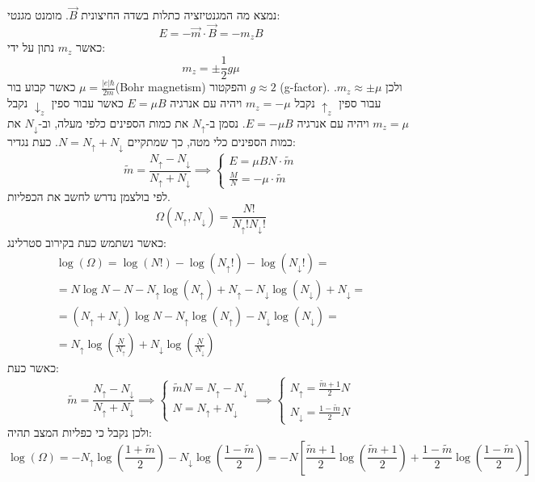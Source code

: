 \documentclass{tstextbook}
\begin{document}
\begin{example}
נמצא מה המגנטיזציה כתלות בשדה החיצונית \(\vec{B}\). מומנט מגנטי:
$$E=-\vec{m}\cdot \vec{B} = -m_{z}{B}$$
כאשר \(m_{z}\) נתון על ידי:
$$m_{z}= \pm \frac{1}{2}g \mu$$
כאשר קבוע בור \(\mu= \frac{|e|\hbar}{2m}\)(Bohr magnetism) והפקטור \(g\approx 2\) (g-factor). ולכן \(m_{z}\approx \pm \mu\).
עבור ספין \(\uparrow_{z}\) נקבל \(m_{z}=-\mu\) ויהיה עם אנרגיה \(E=\mu B\) כאשר עבור ספין \(\downarrow_{z}\) נקבל \(m_{z}=\mu\) ויהיה עם אנרגיה \(E=-\mu B\).
נסמן ב-\(N_{\uparrow}\) את כמות הספינים כלפי מעלה, וב-\(N_{\downarrow}\) את כמות הספינים כלי מטה, כך שמתקיים \(N=N_{\uparrow}+N_{\downarrow}\). כעת נגדיר:
$$\tilde{m}=\frac{N_{\uparrow }-N_{\downarrow }}{N_{\uparrow }+N_{\downarrow }}\implies \begin{cases}E=\mu B N \cdot \tilde{m} \\\frac{M}{N}=-\mu \cdot \tilde{m}
\end{cases}$$
לפי בולצמן נדרש לחשב את הכפליות.
$$\Omega\left( N_{\uparrow },N_{\downarrow } \right)=\frac{N!}{N_{\uparrow }!N_{\downarrow }!}$$
כאשר נשתמש כעת בקירוב סטרלינג:
$$\begin{gather}\log\left( \Omega \right)=\log(N!)-\log\left( N_{\uparrow }! \right) - \log\left( N_{\downarrow }! \right)= \\= N \log N - N -N_{\uparrow }\log\left( N_{\uparrow } \right)+N_{\uparrow }-N_{\downarrow }\log\left( N_{\downarrow } \right)+N_{\downarrow }=  \\=\left( N_{\uparrow }+N_{\downarrow } \right) \log N -N_{\uparrow }\log\left( N_{\uparrow } \right)-N_{\downarrow }\log\left( N_{\downarrow } \right)= \\=N_{\uparrow }\log\left( \frac{N}{N_{\uparrow }} \right)+N_{\downarrow }\log\left( \frac{N}{N_{\downarrow }} \right)
\end{gather}$$
כאשר כעת:
$$\tilde{m}= \frac{N_{\uparrow }-N_{\downarrow }}{N_{\uparrow }+N_{\downarrow }}\implies \begin{cases} \tilde{m}N = N_{\uparrow }-N_{\downarrow } \\N= N_{\uparrow }+N_{\downarrow }\end{cases}\implies  \begin{cases}N_{\uparrow }= \frac{\tilde{m} + 1}{2} N \\N_{\downarrow }= \frac{1 - \tilde{m}}{2} N
\end{cases}$$
ולכן נקבל כי כפליות המצב תהיה:
$$\log\left( \Omega \right)=-N_{\uparrow }\log\left( \frac{1+\tilde{m}}{2} \right)-N_{\downarrow }\log\left( \frac{1-\tilde{m}}{2} \right)=-N\left[ \frac{\tilde{m}+1}{2}\log\left( \frac{\tilde{m}+1}{2} \right)+\frac{1-\tilde{m}}{2} \log\left( \frac{1-\tilde{m}}{2} \right)\right]$$

\end{example}
\end{document}
